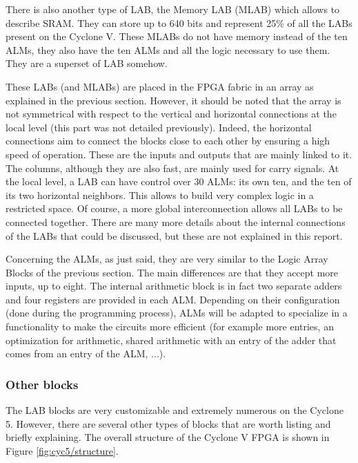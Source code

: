 There is also another type of LAB, the Memory LAB (MLAB) which allows to describe SRAM. They can 
store up to 640 bits and represent 25\% of all the LABs present on the Cyclone V. These MLABs do not 
have memory instead of the ten ALMs, they also have the ten ALMs and all the logic necessary 
to use them. They are a superset of LAB somehow.

These LABs (and MLABs) are placed in the FPGA fabric in an array as explained in the previous 
section. However, it should be noted that the array is not symmetrical with respect 
to the vertical and horizontal connections at the local level (this part was not detailed 
previously). Indeed, the horizontal connections aim to connect the blocks close to each other by 
ensuring a high speed of operation. These are the inputs and outputs that are mainly linked to it. 
The columns, although they are also fast, are mainly used for carry signals. At the local level, a 
LAB can have control over 30 ALMs: its own ten, and the ten of its two horizontal neighbors. This
allows to build very complex logic in a restricted space. Of course, a more global interconnection 
allows all LABs to be connected together. There are many more details about the internal 
connections of the LABs that could be discussed, but these are not explained in this report.

Concerning the ALMs, as just said, they are very similar to the Logic Array Blocks of 
the previous section. The main differences are that they accept more inputs, up to eight. The 
internal arithmetic block is in fact two separate adders and four registers are provided in each ALM. 
Depending on their configuration (done during the programming process), ALMs will be adapted to 
specialize in a functionality to make the circuits more efficient (for example more entries, an 
optimization for arithmetic, shared arithmetic with an entry of the adder that comes from an entry 
of the ALM, ...). 

\subsubsection*{Other blocks}

The LAB blocks are very customizable and extremely numerous on the Cyclone 5. However, there are 
several other types of blocks that are worth listing and briefly explaining. The overall structure 
of the Cyclone V FPGA is shown in Figure \ref{fig:cyc5/structure}.

